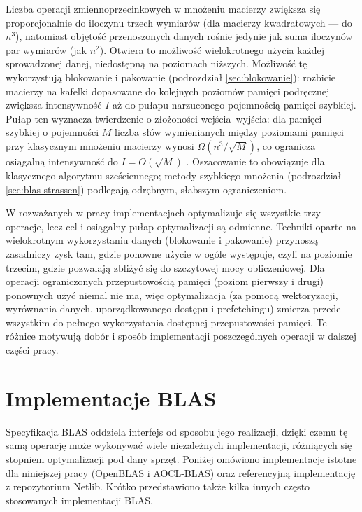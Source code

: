 \documentclass[a4paper,12pt]{book} %
\begin{document}
Liczba operacji zmiennoprzecinkowych w mnożeniu macierzy zwiększa się proporcjonalnie do iloczynu trzech wymiarów (dla macierzy kwadratowych --- do $n^3$), natomiast objętość przenoszonych danych rośnie jedynie jak suma iloczynów par wymiarów (jak $n^2$). Otwiera to możliwość wielokrotnego użycia każdej sprowadzonej danej, niedostępną na poziomach niższych. Możliwość tę wykorzystują blokowanie i pakowanie (podrozdział \ref{sec:blokowanie}): rozbicie macierzy na kafelki dopasowane do kolejnych poziomów pamięci podręcznej zwiększa intensywność $I$ aż do pułapu narzuconego pojemnością pamięci szybkiej. Pułap ten wyznacza twierdzenie o złożoności wejścia--wyjścia: dla pamięci szybkiej o pojemności $M$ liczba słów wymienianych między poziomami pamięci przy klasycznym mnożeniu macierzy wynosi $\Omega\!\left(n^3/\sqrt{M}\right)$, co ogranicza osiągalną intensywność do $I = O\!\left(\sqrt{M}\right)$ \cite{hong1981redblue}. Oszacowanie to obowiązuje dla klasycznego algorytmu sześciennego; metody szybkiego mnożenia (podrozdział \ref{sec:blas-strassen}) podlegają odrębnym, słabszym ograniczeniom.

W rozważanych w pracy implementacjach optymalizuje się wszystkie trzy operacje, lecz cel i osiągalny pułap optymalizacji są odmienne. Techniki oparte na wielokrotnym wykorzystaniu danych (blokowanie i pakowanie) przynoszą zasadniczy zysk tam, gdzie ponowne użycie w ogóle występuje, czyli na poziomie trzecim, gdzie pozwalają zbliżyć się do szczytowej mocy obliczeniowej. Dla operacji ograniczonych przepustowością pamięci (poziom pierwszy i drugi) ponownych użyć niemal nie ma, więc optymalizacja (za pomocą wektoryzacji, wyrównania danych, uporządkowanego dostępu i prefetchingu) zmierza przede wszystkim do pełnego wykorzystania dostępnej przepustowości pamięci. Te różnice motywują dobór i sposób implementacji poszczególnych operacji w dalszej części pracy.

\section{Implementacje BLAS}
\label{sec:blas-implementacje}

Specyfikacja BLAS oddziela interfejs od sposobu jego realizacji, dzięki czemu tę samą operację może wykonywać wiele niezależnych implementacji, różniących się stopniem optymalizacji pod dany sprzęt. Poniżej omówiono implementacje istotne dla niniejszej pracy (OpenBLAS i AOCL-BLAS) oraz referencyjną implementację z repozytorium Netlib. Krótko przedstawiono także kilka innych często stosowanych implementacji BLAS.
\end{document}
